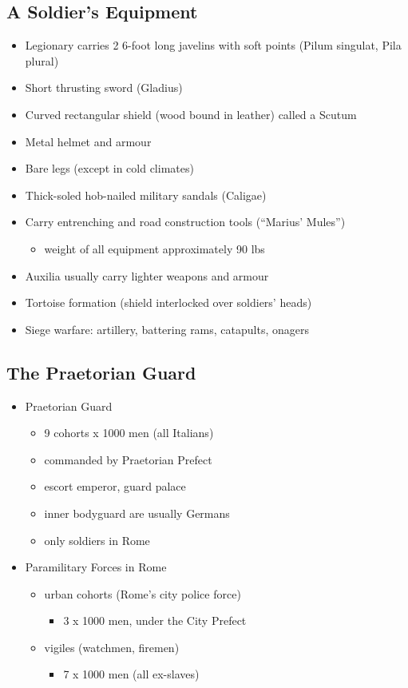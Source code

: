 \documentclass[12pt, twoside]{article}
\begin{document}
\subsection{A Soldier’s Equipment} 
\begin{itemize}
\item Legionary carries 2 6-foot long javelins with soft points (Pilum singulat, Pila plural)
\item Short thrusting sword (Gladius)
\item Curved rectangular shield (wood bound in leather) called a Scutum
\item Metal helmet and armour
\item Bare legs (except in cold climates)
\item Thick-soled hob-nailed military sandals (Caligae)
\item Carry entrenching and road construction tools (“Marius’ Mules”)
	\begin{itemize}
	\item weight of all equipment approximately 90 lbs
	\end{itemize}
\item Auxilia usually carry lighter weapons and armour
\item Tortoise formation (shield interlocked over soldiers' heads)
\item Siege warfare: artillery, battering rams, catapults, onagers
\end{itemize}

\subsection{The Praetorian Guard}
\begin{itemize}
\item Praetorian Guard
	\begin{itemize}
	\item 9 cohorts x 1000 men (all Italians)
	\item commanded by Praetorian Prefect
	\item escort emperor, guard palace
	\item inner bodyguard are usually Germans
	\item only soldiers in Rome
	\end{itemize}
\item Paramilitary Forces in Rome
	\begin{itemize}
	\item urban cohorts (Rome’s city police force)
		\begin{itemize}
		\item 3 x 1000 men, under the City Prefect
		\end{itemize}
	\item vigiles (watchmen, firemen)
		\begin{itemize}
		\item 7 x 1000 men (all ex-slaves)
		\end{itemize}
	\end{itemize}
\end{itemize} 
\end{document}
